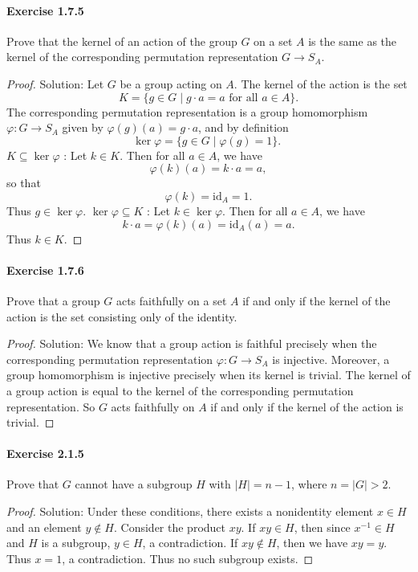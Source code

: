 \documentclass{article}
\theoremstyle{definition}
\begin{document}
\paragraph{Exercise 1.7.5} Prove that the kernel of an action of the group $G$ on a set $A$ is the same as the kernel of the corresponding permutation representation $G\to S_A$.
\begin{proof}
    Solution: Let $G$ be a group acting on $A$. The kernel of the action is the set
$$
K=\{g \in G \mid g \cdot a=a \text { for all } a \in A\} .
$$
The corresponding permutation representation is a group homomorphism $\varphi: G \rightarrow S_A$ given by $\varphi(g)(a)=g \cdot a$, and by definition
$$
\operatorname{ker} \varphi=\{g \in G \mid \varphi(g)=1\} \text {. }
$$
$K \subseteq \operatorname{ker} \varphi$ : Let $k \in K$. Then for all $a \in A$, we have
$$
\varphi(k)(a)=k \cdot a=a,
$$
so that
$$
\varphi(k)=\mathrm{id}_A=1 .
$$
Thus $g \in \operatorname{ker} \varphi$.
$\operatorname{ker} \varphi \subseteq K$ : Let $k \in \operatorname{ker} \varphi$. Then for all $a \in A$, we have
$$
k \cdot a=\varphi(k)(a)=\mathrm{id}_A(a)=a .
$$
Thus $k \in K$.
\end{proof}


\paragraph{Exercise 1.7.6} Prove that a group $G$ acts faithfully on a set $A$ if and only if the kernel of the action is the set consisting only of the identity.
\begin{proof}
    Solution: We know that a group action is faithful precisely when the corresponding permutation representation $\varphi: G \rightarrow S_A$ is injective. Moreover, a group homomorphism is injective precisely when its kernel is trivial. The kernel of a group action is equal to the kernel of the corresponding permutation representation. So $G$ acts faithfully on $A$ if and only if the kernel of the action is trivial.
\end{proof}


\paragraph{Exercise 2.1.5} Prove that $G$ cannot have a subgroup $H$ with $|H|=n-1$, where $n=|G|>2$.
\begin{proof}
    Solution: Under these conditions, there exists a nonidentity element $x \in H$ and an element $y \notin H$. Consider the product $x y$. If $x y \in H$, then since $x^{-1} \in H$ and $H$ is a subgroup, $y \in H$, a contradiction. If $x y \notin H$, then we have $x y=y$. Thus $x=1$, a contradiction. Thus no such subgroup exists.
\end{proof}
\end{document}
